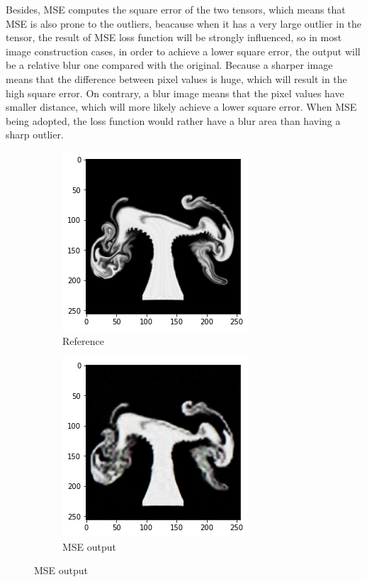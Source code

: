 \documentclass[a4paper,12pt,twoside]{report}
\begin{document}
Besides, MSE computes the square error of the two tensors, which means that MSE is also prone to the outliers, beacause when it has a very large outlier in the tensor, the result of MSE loss function will be strongly influenced, so in most image construction cases, in order to achieve a lower square error, the output will be a relative blur one compared with the original. Because a sharper image means that the difference between pixel values is huge, which will result in the high square error. On contrary, a blur image means that the pixel values have smaller distance, which will more likely achieve a lower square error. When MSE being adopted, the loss function would rather have a blur area than having a sharp outlier.
\begin{figure}
\centering
\begin{subfigure}{0.4\textwidth}
  \centering
  \includegraphics[scale=0.5]{MSEref.png}
  \caption{Reference}
\end{subfigure}
\begin{subfigure}{0.4\textwidth}
  \centering
  \includegraphics[scale=0.5]{MSEblur.png}
  \caption{MSE output}
\end{subfigure}
\end{figure}
 
\end{document}
